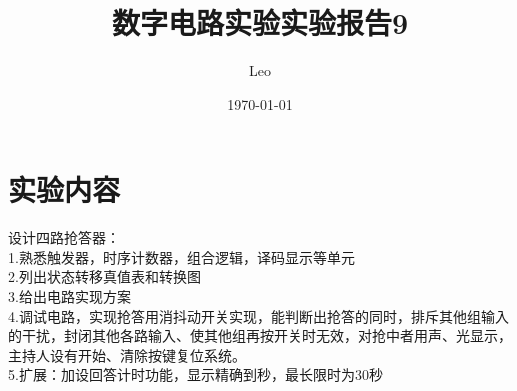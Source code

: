 \documentclass{ctexart}
\title{数字电路实验\quad 实验报告9}
\author{Leo}
\date{\today}
\begin{document}
\maketitle
\section{实验内容}
设计四路抢答器：\\
1.熟悉触发器，时序计数器，组合逻辑，译码显示等单元\\
2.列出状态转移真值表和转换图 \\
3.给出电路实现方案\\
4.调试电路，实现抢答用消抖动开关实现，能判断出抢答的同时，排斥其他组输入的干扰，封闭其他各路输入、使其他组再按开关时无效，对抢中者用声、光显示，主持人设有开始、清除按键复位系统。\\
5.扩展：加设回答计时功能，显示精确到秒，最长限时为30秒\\
\end{document}
